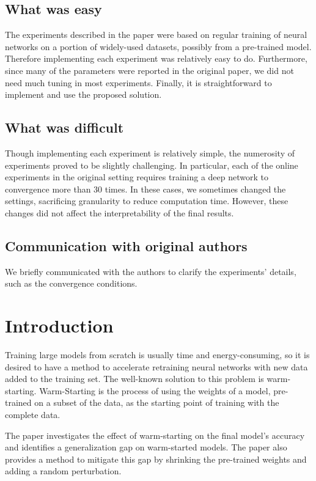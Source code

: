 \subsection*{What was easy}

The experiments described in the paper were based on regular training of neural networks on a portion of widely-used datasets, possibly from a pre-trained model. Therefore implementing each experiment was relatively easy to do. Furthermore, since many of the parameters were reported in the original paper, we did not need much tuning in most experiments. Finally, it is straightforward to implement and use the proposed solution. 

\subsection*{What was difficult}

Though implementing each experiment is relatively simple, the numerosity of experiments proved to be slightly challenging. In particular, each of the online experiments in the original setting requires training a deep network to convergence more than 30 times. In these cases, we sometimes changed the settings, sacrificing granularity to reduce computation time. However, these changes did not affect the interpretability of the final results. 
\subsection*{Communication with original authors}
We briefly communicated with the authors to clarify the experiments' details, such as the convergence conditions.

\section{Introduction}
Training large models from scratch is usually time and energy-consuming, so it is desired to have a method to accelerate retraining neural networks with new data added to the training set. The well-known solution to this problem is warm-starting.
Warm-Starting is the process of using the weights of a model, pre-trained on a subset of the data, as the starting point of training with the complete data. 

The paper investigates the effect of warm-starting on the final model's accuracy and identifies a generalization gap on warm-started models. The paper also provides a method to mitigate this gap by shrinking the pre-trained weights and adding a random perturbation. 

